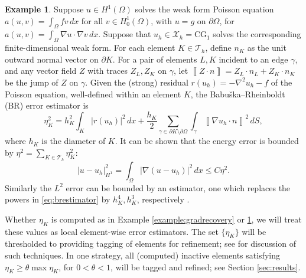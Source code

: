 \documentclass[]{interact}
\theoremstyle{plain}%
\theoremstyle{definition}
\newtheorem{example}[theorem]{Example}
\theoremstyle{remark}
\newcommand{\grad}{\nabla}
\newcommand{\cT}{\mathcal{T}}
\newcommand{\cX}{\mathcal{X}}
\newcommand{\CG}{\text{CG}}
\begin{document}
\begin{example}  \label{example:br}  Suppose $u \in H^1(\Omega)$ solves the weak form Poisson equation $a(u,v) = \int_\Omega f v\,dx$ for all $v \in H^1_0(\Omega)$, with $u=g$ on $\partial \Omega$, for $a(u,v)=\int_\Omega \grad u\cdot \grad v\,dx$.  Suppose that $u_h\in\cX_h=\CG_1$ solves the corresponding finite-dimensional weak form.  For each element $K \in \cT_h$, define $n_K$ as the unit outward normal vector on $\partial K$.  For a pair of elements $L,K$ incident to an edge $\gamma$, and any vector field $Z$ with traces $Z_L,Z_K$ on $\gamma$, let $\left\llbracket Z \cdot n \right\rrbracket = Z_L \cdot n_L + Z_K \cdot n_K$ be the jump of $Z$ on $\gamma$.  Given the (strong) residual $r(u_h)=-\nabla^2 u_h - f$ of the Poisson equation, well-defined within an element $K$, the Babu\v{s}ka--Rheinboldt (BR) \cite{BabuskaRheinboldt1979} error estimator is
\begin{equation} \label{eq:brestimator}
\eta_K^2 = h_K^2 \int_K |r(u_h)|^2\,dx + \frac{h_K}{2} \sum_{\gamma \in \partial K \setminus \partial \Omega} \int_{\gamma} \left\llbracket \grad u_h \cdot n \right\rrbracket^2\,dS,
\end{equation}
where $h_K$ is the diameter of $K$.  It can be shown \cite[Chapter 2]{AinsworthOden2000} that the energy error is bounded by $\eta^2 = \sum_{K\in\cT_h} \eta_K^2$:
\begin{equation} \label{eq:brbound}
|u-u_h|_{H^1}^2 = \int_\Omega |\grad(u-u_h)|^2\,dx \le C \eta^2.
\end{equation}
Similarly the $L^2$ error can be bounded by an estimator, one which replaces the powers in \eqref{eq:brestimator} by $h_K^4,h_K^3$, respectively \cite[Section 2.4]{AinsworthOden2000}.
\end{example}

Whether $\eta_K$ is computed as in Example \ref{example:gradrecovery} or \ref{example:br}, we will treat these values as local element-wise error estimators.  The set $\{\eta_K\}$ will be thresholded to providing tagging of elements for refinement; see \cite[Section 4.2]{BangerthRannacher2003} for discussion of such techniques.  In one strategy, all (computed) inactive elements satisfying $\eta_K \ge \theta \max \eta_K$, for $0<\theta<1$, will be tagged and refined; see Section \ref{sec:results}.
\end{document}
